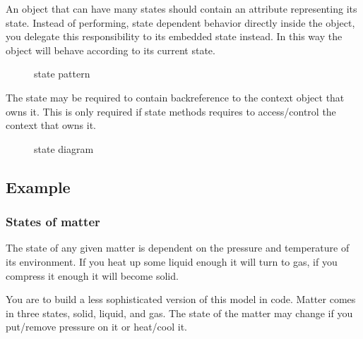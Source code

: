 An object that can have many states should contain an attribute
representing its state. Instead of performing, state dependent behavior
directly inside the object, you delegate this responsibility to its
embedded state instead. In this way the object will behave according to
its current state.

\begin{figure}
\centering
{}
\caption{state pattern}
\end{figure}

The state may be required to contain backreference to the context object
that owns it. This is only required if state methods requires to
access/control the context that owns it.

\begin{figure}
\centering
{}
\caption{state diagram}
\end{figure}

\subsection{Example}\label{behavioral-patterns.md__example-1}

\subsubsection{States of
matter}\label{behavioral-patterns.md__states-of-matter}

The state of any given matter is dependent on the pressure and
temperature of its environment. If you heat up some liquid enough it
will turn to gas, if you compress it enough it will become solid.

You are to build a less sophisticated version of this model in code.
Matter comes in three states, solid, liquid, and gas. The state of the
matter may change if you put/remove pressure on it or heat/cool it.

